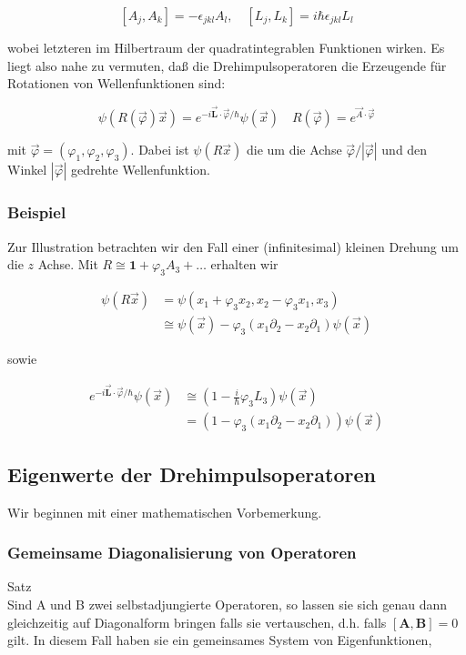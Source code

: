 \documentclass[10pt, letterpaper]{article}
\begin{document}
$$
\left[A_{j}, A_{k}\right]=-\epsilon_{j k l} A_{l}, \quad\left[L_{j}, L_{k}\right]=i \hbar \epsilon_{j k l} L_{l}
$$

wobei letzteren im Hilbertraum der quadratintegrablen Funktionen wirken. Es liegt also nahe zu vermuten, daß die Drehimpulsoperatoren die Erzeugende für Rotationen von Wellenfunktionen sind:

$$
\psi(R(\vec{\varphi}) \vec{x})=e^{-i \overrightarrow{\mathbf{L}} \cdot \vec{\varphi} / \hbar} \psi(\vec{x}) \quad R(\vec{\varphi})=e^{\vec{A} \cdot \vec{\varphi}}
$$

mit $\vec{\varphi}=\left(\varphi_{1}, \varphi_{2}, \varphi_{3}\right)$. Dabei ist $\psi(R \vec{x})$ die um die Achse $\vec{\varphi} /|\vec{\varphi}|$ und den Winkel $|\vec{\varphi}|$ gedrehte Wellenfunktion.

\subsubsection*{Beispiel}
Zur Illustration betrachten wir den Fall einer (infinitesimal) kleinen Drehung um die $z$ Achse. Mit $R \cong \mathbf{1}+\varphi_{3} A_{3}+\ldots$ erhalten wir

$$
\begin{aligned}
\psi(R \vec{x}) & =\psi\left(x_{1}+\varphi_{3} x_{2}, x_{2}-\varphi_{3} x_{1}, x_{3}\right) \\
& \cong \psi(\vec{x})-\varphi_{3}\left(x_{1} \partial_{2}-x_{2} \partial_{1}\right) \psi(\vec{x})
\end{aligned}
$$

sowie

$$
\begin{aligned}
e^{-i \overrightarrow{\mathbf{L}} \cdot \vec{\varphi} / \hbar} \psi(\vec{x}) & \cong\left(1-\frac{i}{\hbar} \varphi_{3} L_{3}\right) \psi(\vec{x}) \\
& =\left(1-\varphi_{3}\left(x_{1} \partial_{2}-x_{2} \partial_{1}\right)\right) \psi(\vec{x})
\end{aligned}
$$

\subsection*{Eigenwerte der Drehimpulsoperatoren}
Wir beginnen mit einer mathematischen Vorbemerkung.

\subsubsection*{Gemeinsame Diagonalisierung von Operatoren}
Satz\\
Sind A und B zwei selbstadjungierte Operatoren, so lassen sie sich genau dann gleichzeitig auf Diagonalform bringen falls sie vertauschen, d.h. falls $[\mathbf{A}, \mathbf{B}]=0$ gilt. In diesem Fall haben sie ein gemeinsames System von Eigenfunktionen,
\end{document}
